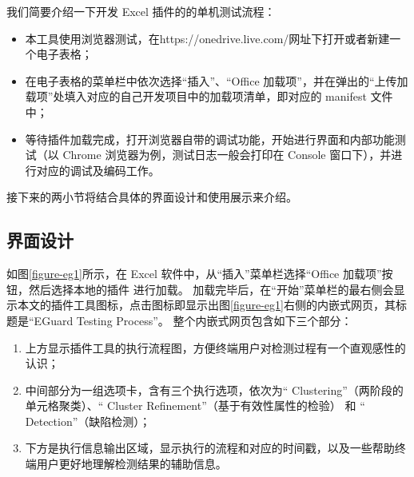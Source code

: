 我们简要介绍一下开发 Excel 插件的的单机测试流程：
\begin{itemize}
    \item 本工具使用浏览器测试，在https://onedrive.live.com/网址下打开或者新建一个电子表格；
    \item 在电子表格的菜单栏中依次选择“插入”、“Office 加载项”，并在弹出的“上传加载项”处填入对应的自己开发项目中的加载项清单，即对应的 manifest 文件中；
    \item 等待插件加载完成，打开浏览器自带的调试功能，开始进行界面和内部功能测试（以 Chrome 浏览器为例，测试日志一般会打印在 Console 窗口下），并进行对应的调试及编码工作。
\end{itemize}

接下来的两小节将结合具体的界面设计和使用展示来介绍\eg 。






\subsection{界面设计}
如图\ref{figure-eg1}所示，在 Excel 软件中，从“插入”菜单栏选择“Office 加载项”按钮，然后选择本地的插件 \eg 进行加载。
加载完毕后，在“开始”菜单栏的最右侧会显示本文的插件工具图标，点击图标即显示出图\ref{figure-eg1}右侧的内嵌式网页，其标题是“EGuard Testing Process”。
整个内嵌式网页包含如下三个部分：

\begin{enumerate}
    \item 上方显示\eg 插件工具的执行流程图，方便终端用户对检测过程有一个直观感性的认识；
    \item 中间部分为一组选项卡，含有三个执行选项，依次为“ Clustering”（两阶段的单元格聚类）、“ Cluster Refinement”（基于有效性属性的检验） 和 “ Detection”（缺陷检测）；
    \item 下方是执行信息输出区域，显示执行的流程和对应的时间戳，以及一些帮助终端用户更好地理解检测结果的辅助信息。
\end{enumerate}

